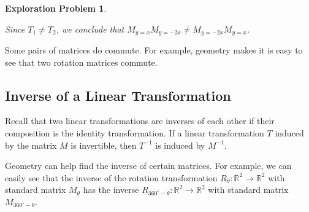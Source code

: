 \documentclass{ximera}
\newcommand{\RR}{\mathbb{R}}
\newtheorem{initprob}{Exploration Problem}
\begin{document}
\begin{initprob}
\begin{image}[4.5in]
\end{image}

Since $T_1\neq T_2$, we conclude that $M_{y=x}M_{y=-2x}\neq M_{y=-2x}M_{y=x}$.

\end{initprob}

\begin{example}\label{ex:rotationscommute}
Some pairs of matrices do commute.  For example, geometry makes it is easy to see that two rotation matrices commute.
\end{example}




 
\subsection*{Inverse of a Linear Transformation}
Recall that two linear transformations are inverses of each other if their composition is the identity transformation.
If a linear transformation $T$ induced by the matrix $M$ is invertible, then $T^{-1}$ is induced by $M^{-1}$.  

Geometry can help find the inverse of certain matrices.  For example, we can easily see that the inverse of the rotation transformation $R_{\theta}:\RR^2\rightarrow \RR^2$ with standard matrix $M_{\theta}$ has the inverse $R_{360^{\circ}-\theta}:\RR^2\rightarrow \RR^2$ with standard matrix $M_{360^{\circ}-\theta}$.
\end{document}
